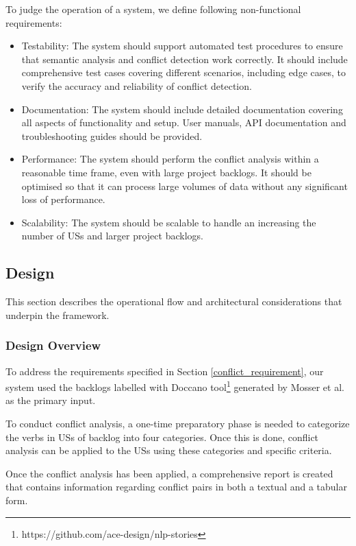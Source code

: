To judge the operation of a system, we define following non-functional requirements:
\begin{itemize}
	\item Testability: The system should support automated test procedures to ensure that semantic analysis and conflict detection work correctly. It should include comprehensive test cases covering different scenarios, including edge cases, to verify the accuracy and reliability of conflict detection.
	
	\item Documentation: The system should include detailed documentation covering all aspects of functionality and setup. User manuals, API documentation and troubleshooting guides should be provided. 
	
	\item Performance: The system should perform the conflict analysis within a reasonable time frame, even with large project backlogs. It should be optimised so that it can process large volumes of data without any significant loss of performance.
	
	\item Scalability: The system should be scalable to handle an increasing the number of USs and larger project backlogs.
		
\end{itemize}

\subsection{Design}\label{conflict_desing}
This section describes the operational flow and architectural considerations that underpin the framework.
\subsubsection*{Design Overview}
To address the requirements specified in Section \ref{conflict_requirement}, our system used the backlogs labelled with Doccano tool\footnote{https://github.com/ace-design/nlp-stories} generated by Mosser et al. as the primary input\cite{arulmohan2023extracting}.

To conduct conflict analysis, a one-time preparatory phase is needed to categorize the verbs in USs of backlog into four categories. Once this is done, conflict analysis can be applied to the USs using these categories and specific criteria.

Once the conflict analysis has been applied, a comprehensive report is created that contains information regarding conflict pairs in both a textual and a tabular form.

